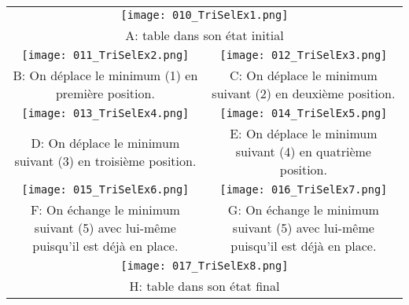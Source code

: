 \documentclass[12pt]{article}
\begin{document}
	\begin{center}
		\begin{tabular}{c c}
			\multicolumn{2}{c}{\texttt{[image: 010\_TriSelEx1.png]}} \\
			\multicolumn{2}{c}{\parbox{0.5\textwidth}{\centering A: table dans son état initial}} \\
			\texttt{[image: 011\_TriSelEx2.png]} & \texttt{[image: 012\_TriSelEx3.png]} \\
			\begin{minipage}{0.5\textwidth}
				B: On déplace le minimum (1) en première position. 
			\end{minipage} & 
			\begin{minipage}{0.5\textwidth}
				C: On déplace le minimum suivant (2) en deuxième position.
			\end{minipage} \\
			\texttt{[image: 013\_TriSelEx4.png]} & \texttt{[image: 014\_TriSelEx5.png]} \\
			\begin{minipage}{0.5\textwidth}
				D: On déplace le minimum suivant (3) en troisième position.
			\end{minipage} & 
			\begin{minipage}{0.5\textwidth}
				E: On déplace le minimum suivant (4) en quatrième position.
			\end{minipage} \\
			\texttt{[image: 015\_TriSelEx6.png]} & \texttt{[image: 016\_TriSelEx7.png]} \\
			\begin{minipage}{0.5\textwidth}
				F: On échange le minimum suivant (5) avec lui-même puisqu'il est déjà en place.
			\end{minipage} & 
			\begin{minipage}{0.5\textwidth}
				G: On échange le minimum suivant (5) avec lui-même puisqu'il est déjà en place.
			\end{minipage} \\
			\multicolumn{2}{c}{\texttt{[image: 017\_TriSelEx8.png]}} \\
			\multicolumn{2}{c}{\parbox{0.5\textwidth}{\centering H: table dans son état final}} \\
		\end{tabular}
	\end{center}
	
\end{document}
